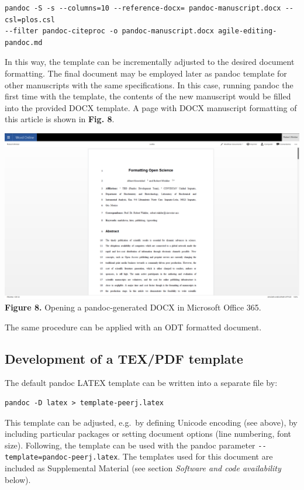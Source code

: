 \documentclass[10pt,fleqn]{wlpeerj}
\begin{document}
\begin{verbatim}
pandoc -S -s --columns=10 --reference-docx= pandoc-manuscript.docx --csl=plos.csl
--filter pandoc-citeproc -o pandoc-manuscript.docx agile-editing-pandoc.md
\end{verbatim}

In
this
way,
the
template
can
be
incrementally
adjusted
to
the
desired
document
formatting.
The
final
document
may
be
employed
later
as
pandoc
template
for
other
manuscripts
with
the
same
specifications.
In
this
case,
running
pandoc
the
first
time
with
the
template,
the
contents
of
the
new
manuscript
would
be
filled
into
the
provided
DOCX
template.
A
page
with
DOCX
manuscript
formatting
of
this
article
is
shown
in
\textbf{Fig.
8}.

\includegraphics{fig-DOCX-document-in-O365.png}
\textbf{Figure
8.}
Opening
a
pandoc-generated
DOCX
in
Microsoft
Office
365.

The
same
procedure
can
be
applied
with
an
ODT
formatted
document.

\subsection{Development
of a
TEX/PDF
template}\label{development-of-a-texpdf-template}

The
default
pandoc
LATEX
template
can
be
written
into
a
separate
file
by:

\begin{verbatim}
pandoc -D latex > template-peerj.latex
\end{verbatim}

This
template
can
be
adjusted,
e.g.~by
defining
Unicode
encoding
(see
above),
by
including
particular
packages
or
setting
document
options
(line
numbering,
font
size).
Following,
the
template
can
be
used
with
the
pandoc
parameter
\texttt{-\/-template=pandoc-peerj.latex}.
The
templates
used
for
this
document
are
included
as
Supplemental
Material
(see
section
\emph{Software
and
code
availability}
below).
\end{document}
